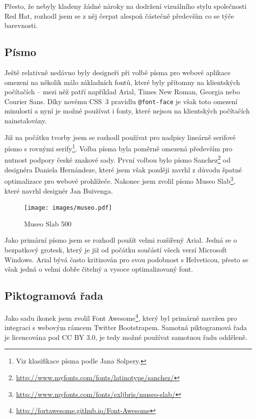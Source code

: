 Přesto, že nebyly kladeny žádné nároky na dodržení vizuálního stylu společnosti Red Hat, rozhodl jsem se z něj čerpat alespoň částečně především co se týče barevnosti.

\subsection{Písmo}

Ještě relativně nedávno byly designeři při volbě písma pro webové aplikace omezeni na několik málo základních fontů, které byly přítomny na klientských počítačích -- mezi něž patří například Arial, Times New Roman, Georgia nebo Courier Sans. Díky novému CSS~3 pravidlu \texttt{@font-face} je však toto omezení minulostí a nyní je možné používat i fonty, které nejsou na klientských počítačích nainstalovány.

Již na počátku tvorby jsem se rozhodl používat pro nadpisy lineárně serifové písmo s rovnými serify\footnote{Viz klasifikace písma podle Jana Solpery.}. Volba písma byla poměrně omezená především pro nutnost podpory české znakové sady. První volbou bylo písmo Sanchez\footnote{\url{http://www.myfonts.com/fonts/latinotype/sanchez/}} od designéra Daniela Hernándeze, které jsem však později zavrhl z důvodu špatné optimalizace pro webové prohlížeče. Nakonec jsem zvolil písmo Museo Slab\footnote{\url{http://www.myfonts.com/fonts/exljbris/museo-slab/}}, které navrhl designér Jan Buivenga.

\begin{figure}[htbp]
    \centering
    \texttt{[image: images/museo.pdf]}
    \caption{Museo Slab 500}
    \label{img:museo}
\end{figure}

Jako primární písmo jsem se rozhodl použít velmi rozšířený Arial. Jedná se o bezpatkový grotesk, který je již od počátku součástí všech verzí Microsoft Windows. Arial bývá často kritizován pro svou podobnost s Helveticou, přesto se však jedná o velmi dobře čitelný a vysoce optimalizovaný font.

\subsection{Piktogramová řada}

Jako sadu ikonek jsem zvolil Font Awesome\footnote{\url{http://fortawesome.github.io/Font-Awesome}}, který byl primárně navržen pro integraci s webovým rámcem Twitter Bootstrapem. Samotná piktogramová řada je licencována pod CC BY 3.0, je tedy možné používat samotnou řadu odděleně.

